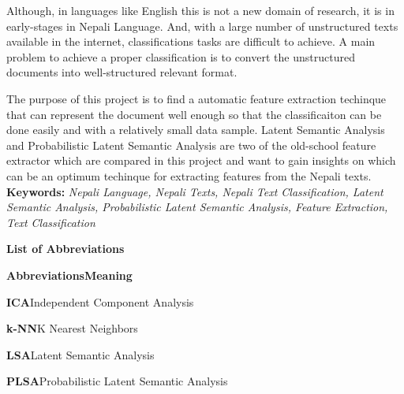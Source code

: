 \documentclass[12pt]{report}
\begin{document}
        Although, in languages like English this is not a new domain of research, it is in early-stages in Nepali Language. And, with a large
        number of unstructured texts available in the internet, classifications tasks are difficult to achieve. A main problem to achieve a proper
        classification is to convert the unstructured documents into well-structured relevant format.

        The purpose of this project is to find a automatic feature extraction techinque that can represent the document well enough so that the classificaiton can be
        done easily and with a relatively small data sample. Latent Semantic Analysis and Probabilistic Latent Semantic Analysis are two of the old-school
        feature extractor which are compared in this project and want to gain insights on which can be an optimum techinque for extracting features from the Nepali texts.\newline\newline
        \textbf{Keywords:} \textit{Nepali Language, Nepali Texts, Nepali Text Classification, Latent Semantic Analysis, Probabilistic Latent Semantic Analysis, Feature Extraction, Text Classification}




        \newpage

    \tableofcontents{}
    \newpage
    \begin{center}
        \textbf{
           \Large List of Abbreviations
        }





    \end{center}

    \textbf{Abbreviations}\hspace{185pt}\textbf{Meaning}

    \hspace{25pt}\textbf{ICA}\hspace{160pt}Independent Component Analysis

    \hspace{25pt}\textbf{k-NN}\hspace{154pt}K Nearest Neighbors


    \hspace{25pt}\textbf{LSA}\hspace{159pt}Latent Semantic Analysis



    \hspace{25pt}\textbf{PLSA}\hspace{152pt}Probabilistic Latent Semantic Analysis
\end{document}
